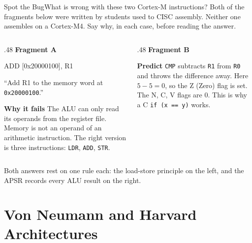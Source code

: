 \documentclass[9pt,aspectratio=169,xcolor=table]{beamer}
\begin{document}
{\beamerextras
\begin{frame}[fragile]{Spot the Bug}{What is wrong with these two Cortex-M instructions?}
    \leavevmode
    Both of the fragments below were written by students used to CISC assembly. Neither one assembles on a Cortex-M4. Say why, in each case, before reading the answer.

    \vspace{3mm}
    \begin{columns}[T]
    \begin{column}{.48\textwidth}
        \textbf{Fragment A}
\begin{asm}[basicstyle=\ttfamily\footnotesize]
    ADD [0x20000100], R1
\end{asm}
        {\footnotesize ``Add R1 to the memory word at \texttt{0x20000100}.''}

        \vspace{2mm}
        \textbf{Why it fails}
        {\footnotesize The ALU can only read its operands from the register file. Memory is \alert{not} an operand of an arithmetic instruction. The right version is three instructions: \texttt{LDR}, \texttt{ADD}, \texttt{STR}.}
    \end{column}
    \begin{column}{.48\textwidth}
        \textbf{Fragment B}

        \textbf{Predict}
        {\footnotesize \texttt{CMP} subtracts \texttt{R1} from \texttt{R0} and throws the difference away. Here $5 - 5 = 0$, so the \alert{Z (Zero) flag} is set. The N, C, V flags are 0. This is why a C \texttt{if (x == y)} works.}
    \end{column}
    \end{columns}

    \vspace{2mm}
    {\small\centering Both answers rest on one rule each: the \alert{load-store principle} on the left, and the \alert{APSR records every ALU result} on the right.\par}
\end{frame}
}


\section{Von Neumann and Harvard Architectures}
\end{document}
